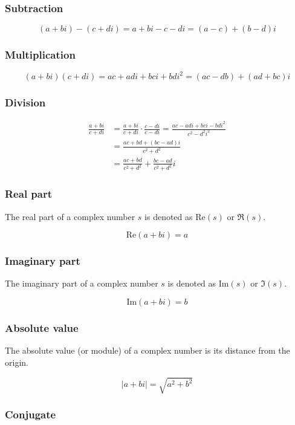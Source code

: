 \documentclass[a4paper]{article}
\begin{document}
\subsubsection{Subtraction}
\[
    (a+bi)-(c+di)=a+bi-c-di=(a-c)+(b-d)i
\]

\subsubsection{Multiplication}
\[
    (a+bi)(c+di)=ac+adi+bci+bdi^2=(ac-db)+(ad+bc)i
\]

\subsubsection{Division}
\begin{align*}
    \frac{a+bi}{c+di} &= \frac{a+bi}{c+di} \cdot \frac{c-di}{c-di} = \frac{ac-adi+bci-bdi^2}{c^2-d^2i^2}
    \\ &= \frac{ac+bd+(bc-ad)i}{c^2+d^2} \\ &= \frac{ac+bd}{c^2+d^2} + \frac{bc-ad}{c^2 + d^2}i
\end{align*}

\subsubsection{Real part}

The real part of a complex number \(s\) is denoted as \(\text{Re}(s)\) or \(\Re(s)\).

\[
    \text{Re}(a+bi) = a
\]

\subsubsection{Imaginary part}

The imaginary part of a complex number \(s\) is denoted as \(\text{Im}(s)\) or \(\Im(s)\).

\[
    \text{Im}(a+bi) = b
\]

\subsubsection{Absolute value}

The absolute value (or module) of a complex number is its distance from the origin.

\[
    |a+bi| = \sqrt{a^2 + b^2}
\]

\subsubsection{Conjugate}
\end{document}
